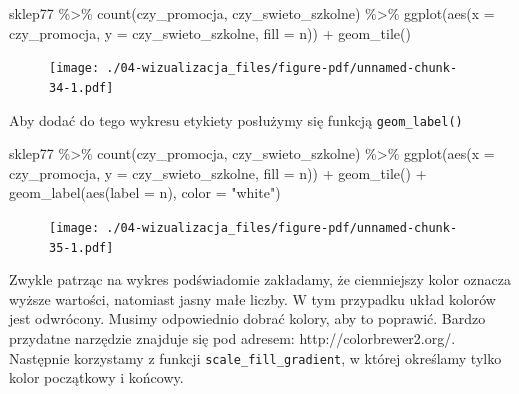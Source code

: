 \documentclass[
  letterpaper,
  DIV=11,
  numbers=noendperiod]{scrreprt}
\newenvironment{Shaded}{\begin{snugshade}}{\end{snugshade}}
\newcommand{\AttributeTok}[1]{\textcolor[rgb]{0.40,0.45,0.13}{#1}}
\newcommand{\FunctionTok}[1]{\textcolor[rgb]{0.28,0.35,0.67}{#1}}
\newcommand{\NormalTok}[1]{\textcolor[rgb]{0.00,0.23,0.31}{#1}}
\newcommand{\SpecialCharTok}[1]{\textcolor[rgb]{0.37,0.37,0.37}{#1}}
\newcommand{\StringTok}[1]{\textcolor[rgb]{0.13,0.47,0.30}{#1}}
\begin{document}
\begin{Shaded}
\begin{Highlighting}[]
\NormalTok{sklep77 }\SpecialCharTok{\%\textgreater{}\%}
  \FunctionTok{count}\NormalTok{(czy\_promocja, czy\_swieto\_szkolne) }\SpecialCharTok{\%\textgreater{}\%}
  \FunctionTok{ggplot}\NormalTok{(}\FunctionTok{aes}\NormalTok{(}\AttributeTok{x =}\NormalTok{ czy\_promocja, }
             \AttributeTok{y =}\NormalTok{ czy\_swieto\_szkolne,}
             \AttributeTok{fill =}\NormalTok{ n)) }\SpecialCharTok{+}
  \FunctionTok{geom\_tile}\NormalTok{()}
\end{Highlighting}
\end{Shaded}

\begin{figure}[H]

{\centering \texttt{[image: ./04-wizualizacja\_files/figure-pdf/unnamed-chunk-34-1.pdf]}

}

\end{figure}

Aby dodać do tego wykresu etykiety posłużymy się funkcją
\texttt{geom\_label()}

\begin{Shaded}
\begin{Highlighting}[]
\NormalTok{sklep77 }\SpecialCharTok{\%\textgreater{}\%}
  \FunctionTok{count}\NormalTok{(czy\_promocja, czy\_swieto\_szkolne) }\SpecialCharTok{\%\textgreater{}\%}
  \FunctionTok{ggplot}\NormalTok{(}\FunctionTok{aes}\NormalTok{(}\AttributeTok{x =}\NormalTok{ czy\_promocja, }
             \AttributeTok{y =}\NormalTok{ czy\_swieto\_szkolne,}
             \AttributeTok{fill =}\NormalTok{ n)) }\SpecialCharTok{+}
  \FunctionTok{geom\_tile}\NormalTok{() }\SpecialCharTok{+}
  \FunctionTok{geom\_label}\NormalTok{(}\FunctionTok{aes}\NormalTok{(}\AttributeTok{label =}\NormalTok{ n), }\AttributeTok{color =} \StringTok{"white"}\NormalTok{)}
\end{Highlighting}
\end{Shaded}

\begin{figure}[H]

{\centering \texttt{[image: ./04-wizualizacja\_files/figure-pdf/unnamed-chunk-35-1.pdf]}

}

\end{figure}

Zwykle patrząc na wykres podświadomie zakładamy, że ciemniejszy kolor
oznacza wyższe wartości, natomiast jasny małe liczby. W tym przypadku
układ kolorów jest odwrócony. Musimy odpowiednio dobrać kolory, aby to
poprawić. Bardzo przydatne narzędzie znajduje się pod adresem:
http://colorbrewer2.org/. Następnie korzystamy z funkcji
\texttt{scale\_fill\_gradient}, w której określamy tylko kolor
początkowy i końcowy.
\end{document}
